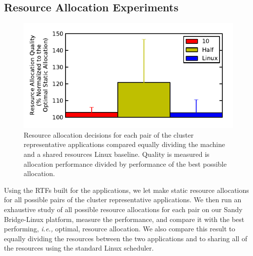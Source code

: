 \subsection{Resource Allocation Experiments}
\begin{figure}[!t]
	\begin{center}	
		\includegraphics[bb=0 0 288 144,width=\columnwidth]{decision_quality.pdf}
		\caption{Resource allocation decisions for each pair of the cluster representative applications compared equally dividing the machine and a shared resources Linux baseline. Quality is measured is allocation performance divided by performance of the best possible allocation.}
		\label{decision_quality}
	\end{center}
\end{figure}


Using the RTFs built for the applications, we let \pacora make static resource allocations for all possible pairs of the cluster representative applications.  We then run an exhaustive study of all possible resource allocations for each pair on our Sandy Bridge-Linux platform, measure the performance, and compare it with the best performing, \emph{i.e.,} optimal, resource allocation.  We also compare this result to equally dividing the resources between the two applications and to sharing all of the resources using the standard Linux scheduler.

